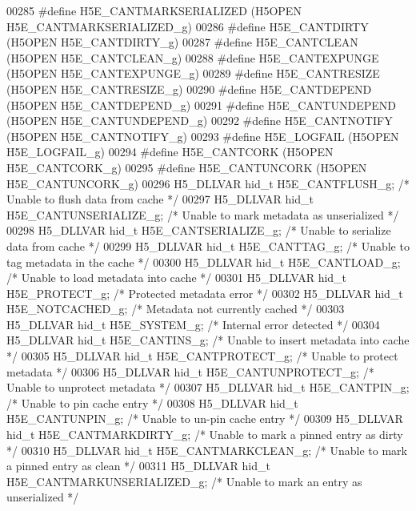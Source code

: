 \begin{DoxyCode}
00285 \textcolor{preprocessor}{#define H5E\_CANTMARKSERIALIZED (H5OPEN H5E\_CANTMARKSERIALIZED\_g)}
00286 \textcolor{preprocessor}{#define H5E\_CANTDIRTY        (H5OPEN H5E\_CANTDIRTY\_g)}
00287 \textcolor{preprocessor}{#define H5E\_CANTCLEAN        (H5OPEN H5E\_CANTCLEAN\_g)}
00288 \textcolor{preprocessor}{#define H5E\_CANTEXPUNGE      (H5OPEN H5E\_CANTEXPUNGE\_g)}
00289 \textcolor{preprocessor}{#define H5E\_CANTRESIZE       (H5OPEN H5E\_CANTRESIZE\_g)}
00290 \textcolor{preprocessor}{#define H5E\_CANTDEPEND       (H5OPEN H5E\_CANTDEPEND\_g)}
00291 \textcolor{preprocessor}{#define H5E\_CANTUNDEPEND     (H5OPEN H5E\_CANTUNDEPEND\_g)}
00292 \textcolor{preprocessor}{#define H5E\_CANTNOTIFY       (H5OPEN H5E\_CANTNOTIFY\_g)}
00293 \textcolor{preprocessor}{#define H5E\_LOGFAIL          (H5OPEN H5E\_LOGFAIL\_g)}
00294 \textcolor{preprocessor}{#define H5E\_CANTCORK         (H5OPEN H5E\_CANTCORK\_g)}
00295 \textcolor{preprocessor}{#define H5E\_CANTUNCORK       (H5OPEN H5E\_CANTUNCORK\_g)}
00296 H5\_DLLVAR hid\_t H5E\_CANTFLUSH\_g;     \textcolor{comment}{/* Unable to flush data from cache */}
00297 H5\_DLLVAR hid\_t H5E\_CANTUNSERIALIZE\_g; \textcolor{comment}{/* Unable to mark metadata as unserialized */}
00298 H5\_DLLVAR hid\_t H5E\_CANTSERIALIZE\_g; \textcolor{comment}{/* Unable to serialize data from cache */}
00299 H5\_DLLVAR hid\_t H5E\_CANTTAG\_g;       \textcolor{comment}{/* Unable to tag metadata in the cache */}
00300 H5\_DLLVAR hid\_t H5E\_CANTLOAD\_g;      \textcolor{comment}{/* Unable to load metadata into cache */}
00301 H5\_DLLVAR hid\_t H5E\_PROTECT\_g;       \textcolor{comment}{/* Protected metadata error */}
00302 H5\_DLLVAR hid\_t H5E\_NOTCACHED\_g;     \textcolor{comment}{/* Metadata not currently cached */}
00303 H5\_DLLVAR hid\_t H5E\_SYSTEM\_g;        \textcolor{comment}{/* Internal error detected */}
00304 H5\_DLLVAR hid\_t H5E\_CANTINS\_g;       \textcolor{comment}{/* Unable to insert metadata into cache */}
00305 H5\_DLLVAR hid\_t H5E\_CANTPROTECT\_g;   \textcolor{comment}{/* Unable to protect metadata */}
00306 H5\_DLLVAR hid\_t H5E\_CANTUNPROTECT\_g; \textcolor{comment}{/* Unable to unprotect metadata */}
00307 H5\_DLLVAR hid\_t H5E\_CANTPIN\_g;       \textcolor{comment}{/* Unable to pin cache entry */}
00308 H5\_DLLVAR hid\_t H5E\_CANTUNPIN\_g;     \textcolor{comment}{/* Unable to un-pin cache entry */}
00309 H5\_DLLVAR hid\_t H5E\_CANTMARKDIRTY\_g; \textcolor{comment}{/* Unable to mark a pinned entry as dirty */}
00310 H5\_DLLVAR hid\_t H5E\_CANTMARKCLEAN\_g; \textcolor{comment}{/* Unable to mark a pinned entry as clean */}
00311 H5\_DLLVAR hid\_t H5E\_CANTMARKUNSERIALIZED\_g; \textcolor{comment}{/* Unable to mark an entry as unserialized */}

\end{DoxyCode}
